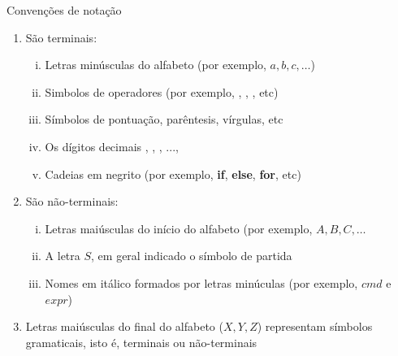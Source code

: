 \begin{frame}[fragile]{Convenções de notação}

    \begin{enumerate}
        \item São terminais:
            \begin{enumerate}[(i)]
                \item Letras minúsculas do alfabeto (por exemplo, $a, b, c, \ldots$)
                \item Simbolos de operadores (por exemplo, , , , etc)
                \item Símbolos de pontuação, parêntesis, vírgulas, etc
                \item Os dígitos decimais , , , ..., 
                \item Cadeias em negrito (por exemplo, \textbf{if}, \textbf{else}, \textbf{for}, etc)
            \end{enumerate}
        \pause

        \item São não-terminais:
            \begin{enumerate}[(i)]
                \item Letras maiúsculas do início do alfabeto (por exemplo, $A, B, C, \ldots$
                \item A letra $S$, em geral indicado o símbolo de partida
                \item Nomes em itálico formados por letras minúculas (por exemplo, $cmd$ e $expr$)
            \end{enumerate}
        \pause

        \item Letras maiúsculas do final do alfabeto ($X, Y, Z$) representam símbolos gramaticais, isto é, terminais ou não-terminais
    \end{enumerate}

\end{frame}

